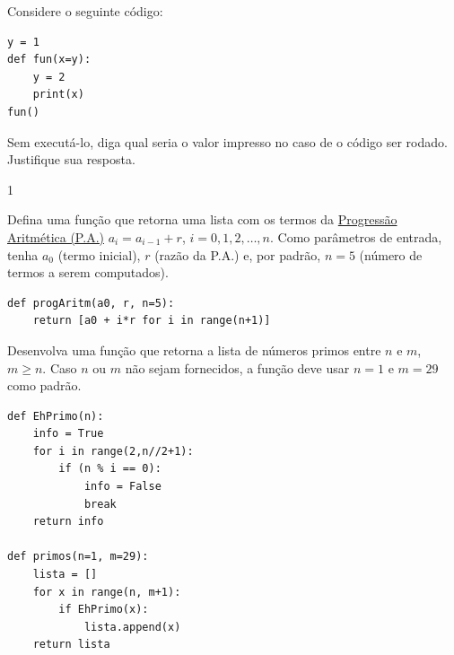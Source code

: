 \begin{exer}
  Considere o seguinte código:

\begin{lstlisting}
y = 1
def fun(x=y):
    y = 2
    print(x)
fun()
\end{lstlisting}
  
Sem executá-lo, diga qual seria o valor impresso no caso de o código ser rodado. Justifique sua resposta.
\end{exer}
\begin{resp}
  1
\end{resp}

\begin{exer}
  Defina uma função {\python} que retorna uma lista com os termos da \href{https://pt.wikipedia.org/wiki/Progress\%C3\%A3o_aritm\%C3\%A9tica}{Progressão Aritmética (P.A.)} $a_i = a_{i-1} + r$, $i = 0, 1, 2, \dotsc, n$. Como parâmetros de entrada, tenha $a_0$ (termo inicial), $r$ (razão da P.A.) e, por padrão, $n = 5$ (número de termos a serem computados).
\end{exer}
\begin{resp}

\begin{lstlisting}
def progAritm(a0, r, n=5):
    return [a0 + i*r for i in range(n+1)]
\end{lstlisting}

\end{resp}

\begin{exer}
  Desenvolva uma função que retorna a lista de números primos entre $n$ e $m$, $m\geq n$. Caso $n$ ou $m$ não sejam fornecidos, a função deve usar $n=1$ e $m=29$ como padrão.
\end{exer}
\begin{resp}

\begin{lstlisting}
def EhPrimo(n):
    info = True
    for i in range(2,n//2+1):
        if (n % i == 0):
            info = False
            break
    return info

def primos(n=1, m=29):
    lista = []
    for x in range(n, m+1):
        if EhPrimo(x):
            lista.append(x)
    return lista
\end{lstlisting}

\end{resp}

